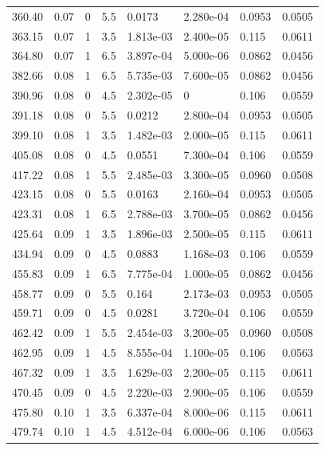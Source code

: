 \documentclass[preview]{standalone}
\begin{document}
{{{\begin{tabular}{L{1.2cm}C{1.2cm} C{0.3cm}C{0.5cm} C{1.4cm}C{1.4cm} C{1.4cm}C{1.4cm}}
  360.40  &  0.07  & 0     & 5.5 &  0.0173  & 2.280e-04  & 0.0953 &  0.0505   \\ 
  363.15  &  0.07  & 1     & 3.5 &  1.813e-03  & 2.400e-05  & 0.115 &  0.0611   \\ 
  364.80  &  0.07  & 1     & 6.5 &  3.897e-04  & 5.000e-06  & 0.0862 &  0.0456   \\ 
  382.66  &  0.08  & 1     & 6.5 &  5.735e-03  & 7.600e-05  & 0.0862 &  0.0456   \\ 
  390.96  &  0.08  & 0     & 4.5 &  2.302e-05  & 0  & 0.106 &  0.0559   \\ 
  391.18  &  0.08  & 0     & 5.5 &  0.0212  & 2.800e-04  & 0.0953 &  0.0505   \\ 
  399.10  &  0.08  & 1     & 3.5 &  1.482e-03  & 2.000e-05  & 0.115 &  0.0611   \\ 
  405.08  &  0.08  & 0     & 4.5 &  0.0551  & 7.300e-04  & 0.106 &  0.0559   \\ 
  417.22  &  0.08  & 1     & 5.5 &  2.485e-03  & 3.300e-05  & 0.0960 &  0.0508   \\ 
  423.15  &  0.08  & 0     & 5.5 &  0.0163  & 2.160e-04  & 0.0953 &  0.0505   \\ 
  423.31  &  0.08  & 1     & 6.5 &  2.788e-03  & 3.700e-05  & 0.0862 &  0.0456   \\ 
  425.64  &  0.09  & 1     & 3.5 &  1.896e-03  & 2.500e-05  & 0.115 &  0.0611   \\ 
  434.94  &  0.09  & 0     & 4.5 &  0.0883  & 1.168e-03  & 0.106 &  0.0559   \\ 
  455.83  &  0.09  & 1     & 6.5 &  7.775e-04  & 1.000e-05  & 0.0862 &  0.0456   \\ 
  458.77  &  0.09  & 0     & 5.5 &  0.164  & 2.173e-03  & 0.0953 &  0.0505   \\ 
  459.71  &  0.09  & 0     & 4.5 &  0.0281  & 3.720e-04  & 0.106 &  0.0559   \\ 
  462.42  &  0.09  & 1     & 5.5 &  2.454e-03  & 3.200e-05  & 0.0960 &  0.0508   \\ 
  462.95  &  0.09  & 1     & 4.5 &  8.555e-04  & 1.100e-05  & 0.106 &  0.0563   \\ 
  467.32  &  0.09  & 1     & 3.5 &  1.629e-03  & 2.200e-05  & 0.115 &  0.0611   \\ 
  470.45  &  0.09  & 0     & 4.5 &  2.220e-03  & 2.900e-05  & 0.106 &  0.0559   \\ 
  475.80  &  0.10  & 1     & 3.5 &  6.337e-04  & 8.000e-06  & 0.115 &  0.0611   \\ 
  479.74  &  0.10  & 1     & 4.5 &  4.512e-04  & 6.000e-06  & 0.106 &  0.0563   \\ 

\end{tabular}}}}
\end{document}
